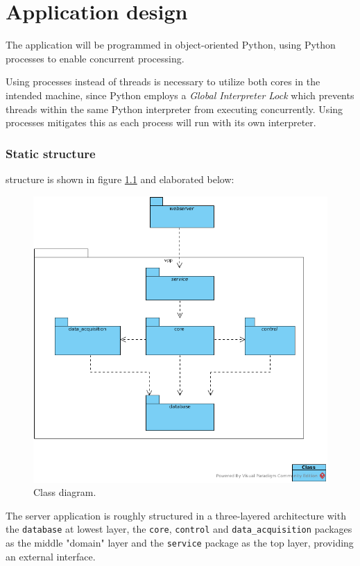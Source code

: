\newpage
\chapter{Application design} \label{ch:sw_design}
The application will be programmed in object-oriented Python, using Python processes to enable concurrent processing. 

Using processes instead of threads is necessary to utilize both cores in the intended machine, since Python employs a \emph{Global Interpreter Lock} which prevents threads within the same Python interpreter from executing concurrently. Using processes mitigates this as each process will run with its own interpreter. 

\subsection{Static structure}
structure is shown in figure \ref{figureClassDiagram} and elaborated below:

\begin{figure}[H]
    \centering
    \includegraphics[width=\textwidth]{figures/class_overview}
    \caption{Class diagram. }
    \label{figureClassDiagram}
\end{figure}

The server application is roughly structured in a three-layered architecture with the \texttt{database} at lowest layer, the \texttt{core}, \texttt{control} and \texttt{data\_acquisition} packages as the middle "domain" layer and the \texttt{service} package as the top layer, providing an external interface. 


